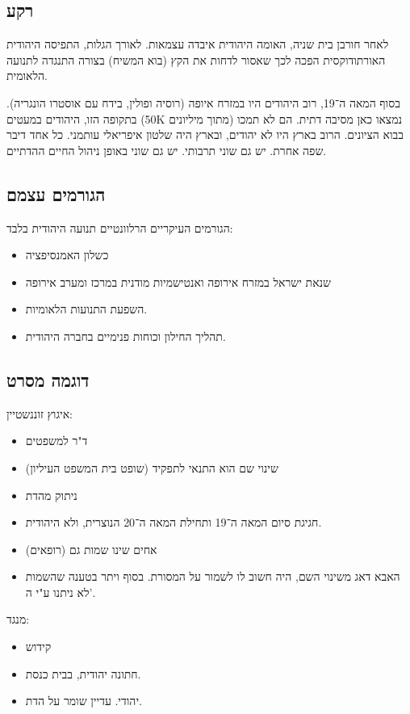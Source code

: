 \documentclass[]{article}
\begin{document}
	\subsection{רקע}
	לאחר חורבן בית שניה, האומה היהודית איבדה עצמאות. לאורך הגלות, התפיסה היהודית האורתודוקסית הפכה לכך שאסור לדחות את הקץ (בוא המשיח) בצורה התנגדה לתנועה הלאומית. 
	
	בסוף המאה ה־19, רוב היהודים היו במזרח איופה (רוסיה ופולין, בידח עם אוסטרו הונגריה). בתקופה הזו, היהודים במעטים (50K מתוך מיליונים) נמצאו כאן מסיבה דתית. הם לא תמכו בבוא הציונים. הרוב בארץ היו לא יהודים, ובארץ היה שלטון איפריאלי עותמני. כל אחד דיבר שפה אחרת. יש גם שוני תרבותי. יש גם שוני באופן ניהול החיים ההדתיים. 
	
	\subsection{הגורמים עצמם}
	הגורמים העיקריים הרלוונטיים תנועה היהודית בלבד: 
	\begin{itemize}
		\item כשלון האמנסיפציה
		\item שנאת ישראל במזרח אירופה ואנטישמיות מודנית במרכז ומערב אירופה
		\item השפעת התנועות הלאומיות. 
		\item תהליך החילון וכוחות פנימיים בחברה היהודית. 
	\end{itemize}
	
	\subsection{דוגמה מסרט}
	איגוץ זוננשטיין: 
	\begin{multicols}{2}
		\begin{itemize}
			\item ד"ר למשפטים
			\item שינוי שם הוא התנאי לתפקיד (שופט בית המשפט העיליון)
			\item ניתוק מהדת
			\item חגיגת סיום המאה ה־19 ותחילת המאה ה־20 הנוצרית, ולא היהודית. 
			\item אחים שינו שמות גם (רופאים)
			\item האבא דאג משינוי השם, היה חשוב לו לשמור על המסורת. בסוף ויתר בטענה שהשמות לא ניתנו ע"י ה'. 
		\end{itemize}
	\end{multicols}
	מנגד: 
	\begin{multicols}{2}
		\begin{itemize}
			\item קידוש
			\item חתונה יהודית, בבית כנסת. 
			\item יהודי. עדיין שומר על הדת. 
		\end{itemize}
	\end{multicols}
	
\end{document}

